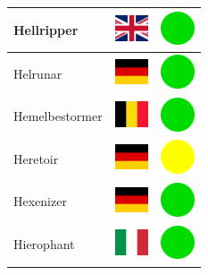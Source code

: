 \documentclass[12pt, a4paper, twoside]{report}
\begin{document}
\begin{center}
\begin{longtable}{|p{5cm}|p{2cm}|p{2cm}|}
Hellripper & \includegraphics[width=1cm]{4x3/gb} & \includegraphics[width=1cm]{likes/y} \\ \hline
Helrunar & \includegraphics[width=1cm]{4x3/de} & \includegraphics[width=1cm]{likes/y} \\ \hline
Hemelbestormer & \includegraphics[width=1cm]{4x3/be} & \includegraphics[width=1cm]{likes/y} \\ \hline
Heretoir & \includegraphics[width=1cm]{4x3/de} & \includegraphics[width=1cm]{likes/m} \\ \hline
Hexenizer & \includegraphics[width=1cm]{4x3/de} & \includegraphics[width=1cm]{likes/y} \\ \hline
Hierophant & \includegraphics[width=1cm]{4x3/it} & \includegraphics[width=1cm]{likes/y} \\ \hline

\end{longtable}
\end{center}
\end{document}
